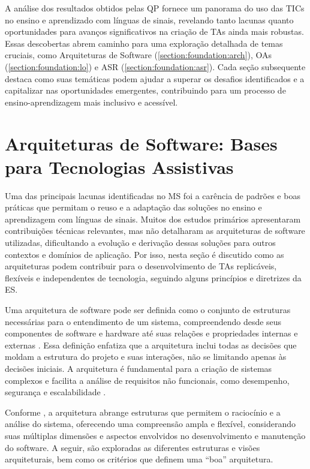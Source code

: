 A análise dos resultados obtidos pelas QP fornece um panorama do uso das TICs no ensino e aprendizado com línguas de sinais, revelando tanto lacunas quanto oportunidades para avanços significativos na criação de TAs ainda mais robustas. Essas descobertas abrem caminho para uma exploração detalhada de temas cruciais, como Arquiteturas de Software (\autoref{section:foundation:arch}), OAs (\autoref{section:foundation:lo}) e ASR (\autoref{section:foundation:asr}). Cada seção subsequente destaca como suas temáticas podem ajudar a superar os desafios identificados e a capitalizar nas oportunidades emergentes, contribuindo para um processo de ensino-aprendizagem mais inclusivo e acessível.

\section{Arquiteturas de Software: Bases para Tecnologias Assistivas}
\label{section:foundation:arch}

Uma das principais lacunas identificadas no MS foi a carência de padrões e boas práticas que permitam o reuso e a adaptação das soluções no ensino e aprendizagem com línguas de sinais. Muitos dos estudos primários apresentaram contribuições técnicas relevantes, mas não detalharam as arquiteturas de software utilizadas, dificultando a evolução e derivação dessas soluções para outros contextos e domínios de aplicação. Por isso, nesta seção é discutido como as arquiteturas podem contribuir para o desenvolvimento de TAs replicáveis, flexíveis e independentes de tecnologia, seguindo alguns princípios e diretrizes da ES.

Uma arquitetura de software pode ser definida como o conjunto de estruturas necessárias para o entendimento de um sistema, compreendendo desde seus componentes de software e hardware até suas relações e propriedades internas e externas \cite{Bass2021}. Essa definição enfatiza que a arquitetura inclui todas as decisões que moldam a estrutura do projeto e suas interações, não se limitando apenas às decisões iniciais. A arquitetura é fundamental para a criação de sistemas complexos e facilita a análise de requisitos não funcionais, como desempenho, segurança e escalabilidade \cite{Pressman2016, Sommerville2015}.

Conforme , a arquitetura abrange estruturas que permitem o raciocínio e a análise do sistema, oferecendo uma compreensão ampla e flexível, considerando suas múltiplas dimensões e aspectos envolvidos no desenvolvimento e manutenção do software. A seguir, são exploradas as diferentes estruturas e visões arquiteturais, bem como os critérios que definem uma ``boa'' arquitetura.

